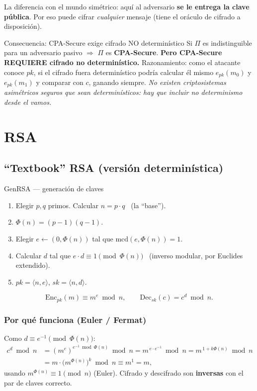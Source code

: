 \documentclass[11pt,a4paper]{article}
\newcommand{\Enc}{\mathrm{Enc}}
\newcommand{\Dec}{\mathrm{Dec}}
\newcommand{\mcd}{\mathrm{mcd}}
\begin{document}
\noindent La diferencia con el mundo simétrico: aquí al adversario \textbf{se le entrega la
clave pública}. Por eso puede cifrar \emph{cualquier} mensaje (tiene el oráculo de cifrado a
disposición).

\begin{warnbox}{Consecuencia: CPA-Secure exige cifrado NO determinístico}
Si $\Pi$ es indistinguible para un adversario pasivo $\Rightarrow$ $\Pi$ es \textbf{CPA-Secure}.
\textbf{Pero CPA-Secure REQUIERE cifrado no determinístico.} Razonamiento: como el atacante
conoce $pk$, si el cifrado fuera determinístico podría calcular él mismo $e_{pk}(m_0)$ y
$e_{pk}(m_1)$ y comparar con $c$, ganando siempre. \emph{No existen criptosistemas asimétricos
seguros que sean determinísticos: hay que incluir no determinismo desde el vamos.}
\end{warnbox}

\section{RSA}

\subsection{``Textbook'' RSA (versión determinística)}
\begin{defbox}{GenRSA — generación de claves}
\begin{enumerate}[leftmargin=1.6em,itemsep=1pt]
  \item Elegir $p,q$ primos. Calcular $n=p\cdot q$ \ (la ``base'').
  \item $\Phi(n)=(p-1)(q-1)$.
  \item Elegir $e \leftarrow (0,\Phi(n))$ tal que $\mcd(e,\Phi(n))=1$.
  \item Calcular $d$ tal que $e\cdot d \equiv 1 \pmod{\Phi(n)}$ \ (inverso modular, por
        Euclides extendido).
  \item $pk=\langle n,e\rangle$, \quad $sk=\langle n,d\rangle$.
\end{enumerate}
\[
  \Enc_{pk}(m) \equiv m^{e} \bmod n, \qquad
  \Dec_{sk}(c) = c^{d} \bmod n.
\]
\end{defbox}

\subsubsection{Por qué funciona (Euler / Fermat)}
Como $d \equiv e^{-1}\pmod{\Phi(n)}$:
\begin{align*}
  c^{d}\bmod n &= (m^{e})^{e^{-1}\bmod\Phi(n)} \bmod n
  = m^{\,e\cdot e^{-1}}\bmod n
  = m^{\,1 + k\Phi(n)}\bmod n\\
  &= m\cdot\bigl(m^{\Phi(n)}\bigr)^{k}\bmod n \equiv m^1 = m,
\end{align*}
usando $m^{\Phi(n)}\equiv 1 \pmod n$ (Euler). Cifrado y descifrado son \textbf{inversas} con el
par de claves correcto.
\end{document}

